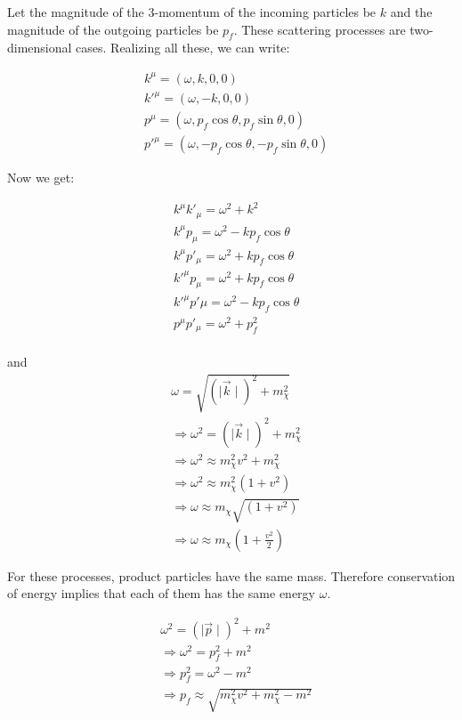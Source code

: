 \documentclass[12pt]{report}
\begin{document}
Let the magnitude of the 3-momentum of the incoming particles be $k$ and the magnitude of the outgoing particles be $p_f$. These scattering processes are two-dimensional cases. Realizing all these, we can write:


\begin{align*}
&k^\mu=(\omega,k,0,0)\\
&k\prime^\mu =(\omega,-k,0,0)\\
&p^\mu =(\omega,p_f \cos\theta, p_f \sin\theta,0)\\
&p\prime^\mu =(\omega,-p_f \cos\theta, -p_f \sin\theta,0)
\end{align*}

Now we get:

\begin{align*}
&k^\mu k\prime_\mu = \omega^2+k^2\\
&k^\mu p_\mu = \omega^2-kp_f \cos\theta\\
&k^\mu p\prime_\mu = \omega^2 + kp_f \cos\theta\\
&k\prime^\mu p_\mu = \omega^2 + kp_f \cos\theta\\
&k\prime^\mu p\prime\mu = \omega^2-kp_f \cos\theta\\
&p^\mu p\prime_\mu =\omega^2+p_f^2
\end{align*}\\
and
\begin{eqnarray}
&\omega = \sqrt{(\mid \vec{k} \mid)^2 + m_\chi^2}\\
&\Rightarrow \omega^2 =(\mid \vec{k} \mid)^2 + m_\chi^2\\
&\Rightarrow \omega^2 \approx m_\chi^2 v^2 + m_\chi^2\\
&\Rightarrow \omega^2 \approx m_\chi^2 (1+v^2)\\
&\Rightarrow \omega \approx m_\chi \sqrt{(1+v^2)}\\
&\Rightarrow \omega \approx m_\chi (1+\frac{v^2}{2})
\end{eqnarray}

For these processes, product particles have the same mass. Therefore conservation of energy implies that each of them has the same energy $\omega$.


\begin{eqnarray}
&\omega^2 = (\mid \vec{p} \mid)^2 + m^2 \\
& \Rightarrow \omega^2 = p_f^2+ m^2\\
&\Rightarrow p_f^2= \omega^2 - m^2 \\
& \Rightarrow p_f \approx \sqrt{m_\chi^2 v^2 + m_\chi^2 -m^2}
\end{eqnarray}
\end{document}
